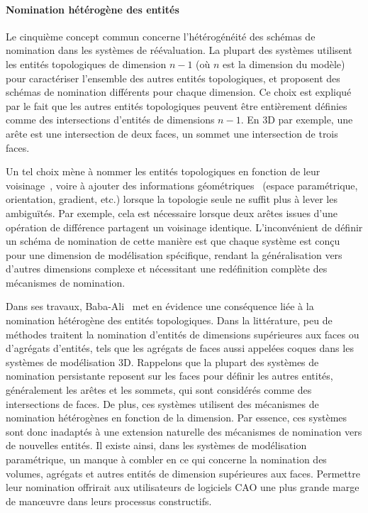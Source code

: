 \paragraph*{Nomination hétérogène des entités}


Le cinquième concept commun concerne l'hétérogénéité des schémas de nomination
dans les systèmes de réévaluation. %
La plupart des systèmes utilisent les entités topologiques de dimension \(n-1\)
(où \(n\) est la dimension du modèle) pour caractériser l'ensemble des autres
entités topologiques, et proposent des schémas de nomination différents pour
chaque dimension. Ce choix est expliqué par le fait que les autres entités
topologiques peuvent être entièrement définies comme des intersections d'entités
de dimensions \(n-1\). En 3D par exemple, une arête est une intersection de
deux faces, un sommet une intersection de trois faces. %


Un tel choix mène à nommer les entités topologiques en fonction de leur
voisinage~\cite{chen1995representation, kripac1995mechanism, CAPOYLEAS199617, agbodan2000persistent},
voire à ajouter des informations
géométriques~\cite{wu2001face, bidarra2005feature, wang2005geometry} (espace
paramétrique, orientation, gradient, etc.) lorsque la topologie seule ne suffit
plus à lever les ambiguïtés. Par exemple, cela est nécessaire lorsque deux arêtes issues d'une opération de différence partagent un voisinage identique. %
L'inconvénient de définir un schéma de nomination de cette manière est que chaque système est conçu pour une dimension de modélisation spécifique, rendant la généralisation vers d'autres dimensions complexe et nécessitant une redéfinition complète des mécanismes de nomination.

Dans ses travaux, Baba-Ali~\cite{babaali2010systeme} met en évidence une conséquence liée à la nomination hétérogène des entités topologiques.
Dans la littérature, peu de méthodes traitent la nomination d'entités de dimensions supérieures aux faces ou d'agrégats
d'entités, tels que les agrégats de faces aussi appelées coques dans les
systèmes de modélisation 3D. %
Rappelons que la plupart des systèmes de nomination persistante reposent sur les faces pour définir les autres entités, généralement les arêtes et les sommets, qui sont considérés comme des intersections de faces. De plus, ces systèmes utilisent des mécanismes de nomination hétérogènes en fonction de la dimension. Par essence, ces systèmes sont donc inadaptés à une extension naturelle des mécanismes de nomination vers de nouvelles entités. %
Il existe ainsi, dans les systèmes de modélisation paramétrique, un manque à
combler en ce qui concerne la nomination des volumes, agrégats et autres
entités de dimension supérieures aux faces. %
Permettre leur nomination offrirait aux utilisateurs de logiciels CAO une plus
grande marge de man\oe uvre dans leurs processus constructifs. %




